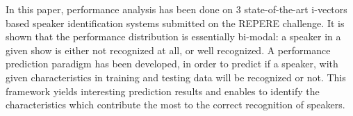 \vspace*{-0.1cm}
In this paper, performance analysis has been done on 3 state-of-the-art i-vectors based speaker identification systems submitted on the REPERE challenge. It is shown that the performance distribution is essentially bi-modal: a speaker in a given show is either not recognized at all, or well recognized. A performance prediction paradigm has been developed, in order to predict if a speaker, with given characteristics in training and testing data will be recognized or not. This framework yields interesting prediction results  and enables to identify the characteristics which contribute the most to the correct recognition of speakers.